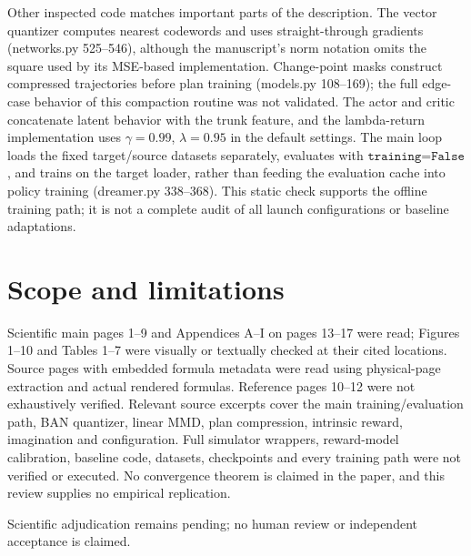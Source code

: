\documentclass[10pt]{article}
\begin{document}
Other inspected code matches important parts of the description. The vector quantizer computes nearest codewords and uses straight-through gradients (networks.py 525–546), although the manuscript’s norm notation omits the square used by its MSE-based implementation. Change-point masks construct compressed trajectories before plan training (models.py 108–169); the full edge-case behavior of this compaction routine was not validated. The actor and critic concatenate latent behavior with the trunk feature, and the lambda-return implementation uses \(\gamma=0.99\), \(\lambda=0.95\) in the default settings. The main loop loads the fixed target/source datasets separately, evaluates with \(\texttt{training=False}\), and trains on the target loader, rather than feeding the evaluation cache into policy training (dreamer.py 338–368). This static check supports the offline training path; it is not a complete audit of all launch configurations or baseline adaptations.\par
\section*{Scope and limitations}
Scientific main pages 1–9 and Appendices A–I on pages 13–17 were read; Figures 1–10 and Tables 1–7 were visually or textually checked at their cited locations. Source pages with embedded formula metadata were read using physical-page extraction and actual rendered formulas. Reference pages 10–12 were not exhaustively verified. Relevant source excerpts cover the main training/evaluation path, BAN quantizer, linear MMD, plan compression, intrinsic reward, imagination and configuration. Full simulator wrappers, reward-model calibration, baseline code, datasets, checkpoints and every training path were not verified or executed. No convergence theorem is claimed in the paper, and this review supplies no empirical replication.\par
Scientific adjudication remains pending; no human review or independent acceptance is claimed.\par
\end{document}
